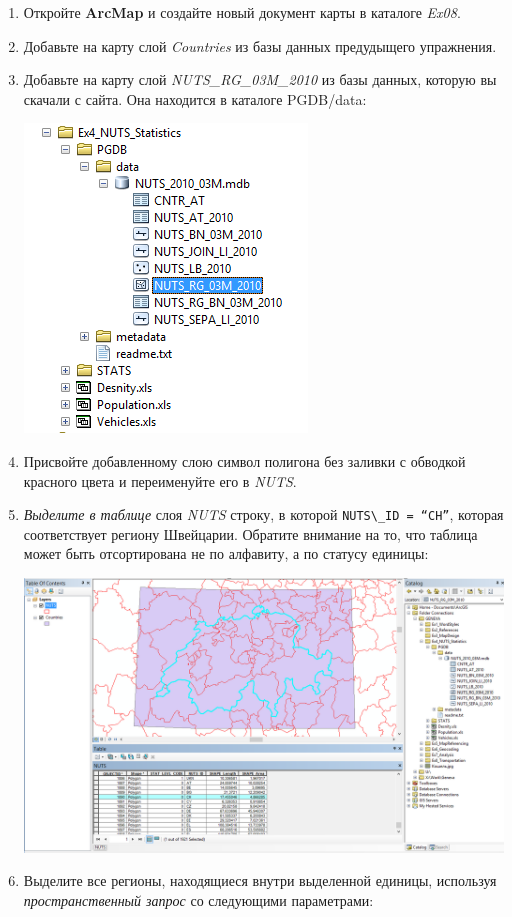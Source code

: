 \documentclass[12pt,]{book}
\begin{document}
\begin{enumerate}
\def\labelenumi{\arabic{enumi}.}
\item
  Откройте \textbf{ArcMap} и создайте новый документ карты в каталоге \emph{Ex08}.
\item
  Добавьте на карту слой \emph{Countries} из базы данных предудыщего упражнения.
\item
  Добавьте на карту слой \emph{NUTS\_RG\_03M\_2010} из базы данных, которую вы скачали с сайта. Она находится в каталоге PGDB/data:

  \includegraphics{images/Ex08/image17.png}
\item
  Присвойте добавленному слою символ полигона без заливки с обводкой красного цвета и переименуйте его в \emph{NUTS}.
\item
  \emph{Выделите в таблице} слоя \emph{NUTS} строку, в которой \texttt{NUTS\textbackslash{}\_ID\ =\ “CH”}, которая соответствует региону Швейцарии. Обратите внимание на то, что таблица может быть отсортирована не по алфавиту, а по статусу единицы:

  \includegraphics{images/Ex08/image18.png}
\item
  Выделите все регионы, находящиеся внутри выделенной единицы, используя \emph{пространственный запрос} со следующими параметрами:


\end{enumerate}
\end{document}
